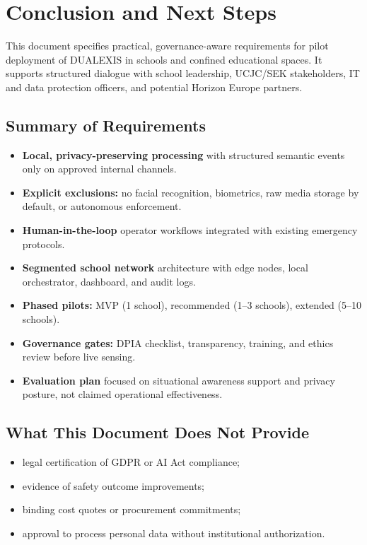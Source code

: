 \section{Conclusion and Next Steps}
\label{sec:conclusion-req}

This document specifies practical, governance-aware requirements for pilot deployment
of DUALEXIS in schools and confined educational spaces.
It supports structured dialogue with school leadership, UCJC/SEK stakeholders, IT and
data protection officers, and potential Horizon Europe partners.

\subsection{Summary of Requirements}

\begin{itemize}[noitemsep]
  \item \textbf{Local, privacy-preserving processing} with structured semantic events only on
        approved internal channels.
  \item \textbf{Explicit exclusions:} no facial recognition, biometrics, raw media storage
        by default, or autonomous enforcement.
  \item \textbf{Human-in-the-loop} operator workflows integrated with existing emergency protocols.
  \item \textbf{Segmented school network} architecture with edge nodes, local orchestrator,
        dashboard, and audit logs.
  \item \textbf{Phased pilots:} MVP (1 school), recommended (1--3 schools), extended (5--10 schools).
  \item \textbf{Governance gates:} DPIA checklist, transparency, training, and ethics review
        before live sensing.
  \item \textbf{Evaluation plan} focused on situational awareness support and privacy posture,
        not claimed operational effectiveness.
\end{itemize}

\subsection{What This Document Does Not Provide}

\begin{itemize}[noitemsep]
  \item legal certification of GDPR or AI Act compliance;
  \item evidence of safety outcome improvements;
  \item binding cost quotes or procurement commitments;
  \item approval to process personal data without institutional authorization.
\end{itemize}


